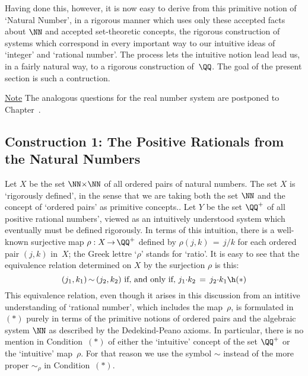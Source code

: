 {        Having done this, however, it is now easy to derive from this primitive notion of `Natural Number',
    in a rigorous manner which uses only these accepted facts about ${\NN}$ and accepted set-theoretic concepts,
    the rigorous construction of systems which correspond in every important way to our intuitive ideas of `integer' and `rational number'.
    The process lets the intuitive notion lead lead us, in a fairly natural way, to a rigorous construction of~${\QQ}$.
    The goal of the present section is such a contruction.

\V

    \underline{Note} The analogous questions for the real number system are postponed to Chapter~.

\VV



        \subsection{\small{{\bf Construction 1: The Positive Rationals from the Natural Numbers}}}
                \label{ConstA50.130A}

 \V

        Let $X$ be the set ${\NN}{\times}{\NN}$ of all ordered pairs of natural numbers.
    The set $X$ is `rigorously defined', in the sense that we are taking both the set ${\NN}$ and the concept of `ordered pairs' as primitive concepts..
    Let $Y$ be the set ${\QQ}^{+}$ of all positive rational numbers', viewed as an intuitively understood system which eventually must be defined rigorously. 
    In terms of this intuition, there is a well-known surjective map ${\rho}:X \,{\rightarrow}\, {\QQ}^{+}$ defined by
    ${\rho}(j,k) \,=\, j/k$ for each ordered pair $(j,k)$ in~$X$; the Greek lettre `${\rho}$' stands for `ratio'.
    It is easy to see that the equivalence relation determined on $X$ by the surjection ${\rho}$ is this:
        \begin{displaymath}
        (j_{1},k_{1}) \,{\sim}\, (j_{2}, k_{2}) \mbox{ if, and only if, }
        j_{1}{\cdot}k_{2} \,=\, j_{2}{\cdot}k_{1} \h ({\ast})
        \end{displaymath}
    This equivalence relation, even though it arises in this discussion from an intitive understanding of `rational number', which includes the map~${\rho}$,
    is formulated in~$({\ast})$ purely in terms of the primitive notions of ordered pairs and the algebraic system ${\NN}$ as described by the Dedekind-Peano axioms.
    In particular, there is no mention in Condition~$({\ast})$ of either the `intuitive' concept of the set ${\QQ}^{+}$ or the `intuitive' map~${\rho}$.
    For that reason we use the symbol ${\sim}$ instead of the more proper ${\sim}_{{\rho}}$ in Condition~$({\ast})$.

}
